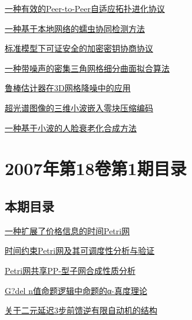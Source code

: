 \documentclass[a4paper]{article}
\begin{document}
\href{http://www.jos.org.cn/ch/reader/download_pdf.aspx?file_no=20070224&year_id=2007&quarter_id=2&falg=1}{一种有效的Peer-to-Peer自适应拓扑进化协议}

\href{http://www.jos.org.cn/ch/reader/download_pdf.aspx?file_no=20070225&year_id=2007&quarter_id=2&falg=1}{一种基于本地网络的蠕虫协同检测方法}

\href{http://www.jos.org.cn/ch/reader/download_pdf.aspx?file_no=20070226&year_id=2007&quarter_id=2&falg=1}{标准模型下可证安全的加密密钥协商协议}

\href{http://www.jos.org.cn/ch/reader/download_pdf.aspx?file_no=20070228&year_id=2007&quarter_id=2&falg=1}{一种带噪声的密集三角网格细分曲面拟合算法}

\href{http://www.jos.org.cn/ch/reader/download_pdf.aspx?file_no=20070229&year_id=2007&quarter_id=2&falg=1}{鲁棒估计器在3D网格降噪中的应用}

\href{http://www.jos.org.cn/ch/reader/download_pdf.aspx?file_no=20070230&year_id=2007&quarter_id=2&falg=1}{超光谱图像的三维小波嵌入零块压缩编码}

\href{http://www.jos.org.cn/ch/reader/download_pdf.aspx?file_no=20070231&year_id=2007&quarter_id=2&falg=1}{一种基于小波的人脸衰老化合成方法}


\section{\textbf{2007年第18卷第1期目录}}
\subsection{本期目录}
\href{http://www.jos.org.cn/ch/reader/download_pdf.aspx?file_no=20070101&year_id=2007&quarter_id=1&falg=1}{一种扩展了价格信息的时间Petri网}

\href{http://www.jos.org.cn/ch/reader/download_pdf.aspx?file_no=20070102&year_id=2007&quarter_id=1&falg=1}{时间约束Petri网及其可调度性分析与验证}

\href{http://www.jos.org.cn/ch/reader/download_pdf.aspx?file_no=20070103&year_id=2007&quarter_id=1&falg=1}{Petri网共享PP-型子网合成性质分析}

\href{http://www.jos.org.cn/ch/reader/download_pdf.aspx?file_no=20070104&year_id=2007&quarter_id=1&falg=1}{G?del n值命题逻辑中命题的α-真度理论}

\href{http://www.jos.org.cn/ch/reader/download_pdf.aspx?file_no=20070105&year_id=2007&quarter_id=1&falg=1}{关于二元延迟3步前馈逆有限自动机的结构}
\end{document}

